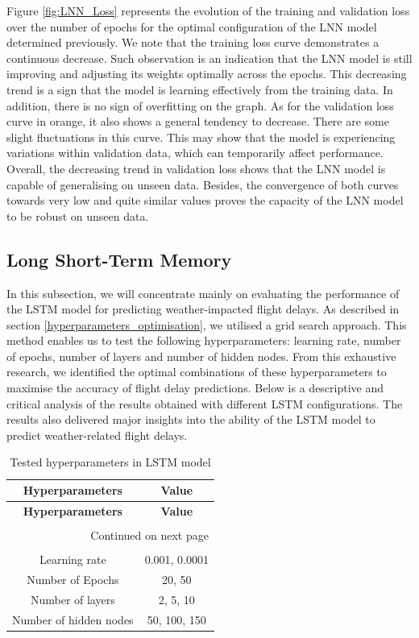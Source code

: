 \documentclass[12pt,oneside]{book} %
\begin{document}
\noindent Figure \ref{fig:LNN_Loss} represents the evolution of the training and validation loss over the number of epochs for the optimal configuration of the LNN model determined previously. We note that the training loss curve demonstrates a continuous decrease. Such observation is an indication that the LNN model is still improving and adjusting its weights optimally across the epochs. This decreasing trend is a sign that the model is learning effectively from the training data. In addition, there is no sign of overfitting on the graph. As for the validation loss curve in orange, it also shows a general tendency to decrease. There are some slight fluctuations in this curve. This may show that the model is experiencing variations within validation data, which can temporarily affect performance. Overall, the decreasing trend in validation loss shows that the LNN model is capable of generalising on unseen data. Besides, the convergence of both curves towards very low and quite similar values proves the capacity of the LNN model to be robust on unseen data.

\subsection{Long Short-Term Memory}

\noindent In this subsection, we will concentrate mainly on evaluating the performance of the LSTM model for predicting weather-impacted flight delays. As described in section \ref{hyperparameters_optimisation}, we utilised a grid search approach. This method enables us to test the following hyperparameters: learning rate, number of epochs, number of layers and number of hidden nodes.  From this exhaustive research, we identified the optimal combinations of these hyperparameters to maximise the accuracy of flight delay predictions. Below is a descriptive and critical analysis of the results obtained with different LSTM configurations. The results also delivered major insights into the ability of the LSTM model to predict weather-related flight delays.

\setlength\LTleft{4cm}
\begin{longtable}{c c}
\caption{Tested hyperparameters in LSTM model} \label{tab:LSTM_hyperparameters} 
\\\hline
\textbf{Hyperparameters} & \textbf{Value} \\ \hline
\endfirsthead

\hline
\textbf{Hyperparameters} & \textbf{Value}  \\ \hline
&\\
\endhead

\hline \multicolumn{2}{r}{{Continued on next page}} \\ \hline
&\\
\endfoot

\hline
\endlastfoot
Learning rate & 0.001, 0.0001\\
Number of Epochs &  20, 50\\ 
Number of layers & 2, 5, 10\\ 
Number of hidden nodes & 50, 100, 150\\
\end{longtable}
\end{document}
